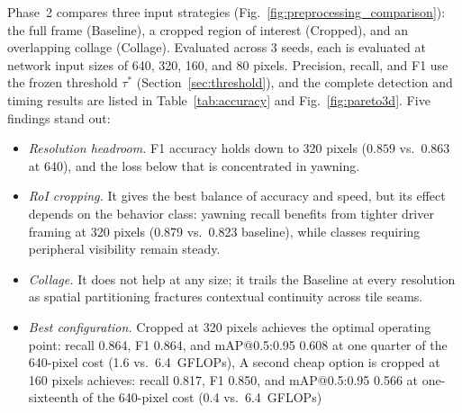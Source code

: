 \documentclass[conference]{IEEEtran}
\begin{document}
Phase~2 compares three input strategies (Fig.~\ref{fig:preprocessing_comparison}): the full frame (Baseline), a cropped region of interest (Cropped), and an overlapping collage (Collage). Evaluated across 3 seeds, each is evaluated at network input sizes of 640, 320, 160, and 80 pixels. Precision, recall, and F1 use the frozen threshold $\tau^*$ (Section~\ref{sec:threshold}), and the complete detection and timing results are listed in Table~\ref{tab:accuracy} and Fig.~\ref{fig:pareto3d}. Five findings stand out:
\begin{itemize}
\item \emph{Resolution headroom.} F1 accuracy holds down to 320 pixels ($0.859$ vs.\ $0.863$ at 640), and the loss below that is concentrated in yawning.
\item \emph{RoI cropping.} It gives the best balance of accuracy and speed, but its effect depends on the behavior class: yawning recall benefits from tighter driver framing at 320 pixels (0.879 vs.\ 0.823 baseline), while classes requiring peripheral visibility remain steady.
\item \emph{Collage.} It does not help at any size; it trails the Baseline at every resolution as spatial partitioning fractures contextual continuity across tile seams.
\item \emph{Best configuration.} Cropped at 320 pixels achieves the optimal operating point: recall 0.864, F1 0.864, and mAP@0.5:0.95 0.608 at one quarter of the 640-pixel cost (1.6 vs.\ 6.4~GFLOPs), A second cheap option is cropped at 160 pixels achieves:  recall 0.817, F1 0.850, and mAP@0.5:0.95 0.566 at one-sixteenth of the 640-pixel cost (0.4 vs.\ 6.4~GFLOPs)
\end{itemize}

%
%
%
\end{document}
